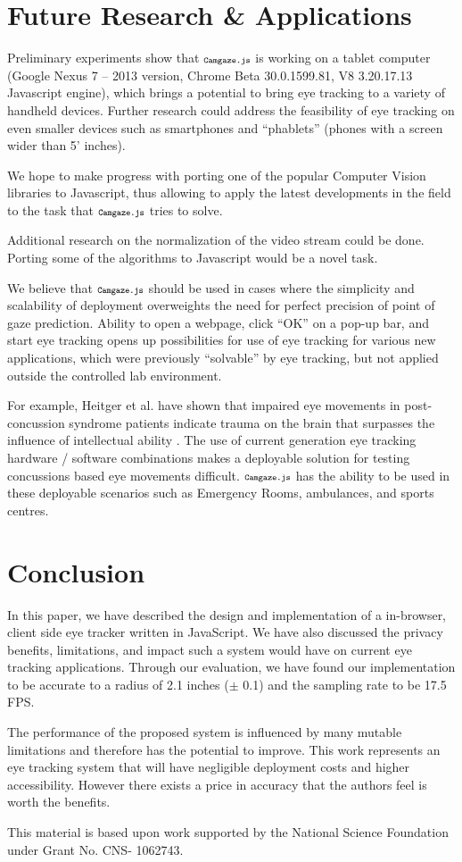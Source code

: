 \documentclass[annual]{acmsiggraph}
\newcommand{\Acronym}[1]{\ensuremath{{\small{\texttt{#1}}}}}
\newcommand{\Name}{\Acronym{Camgaze.js}} \newcommand{\False}{\Constant{false}}
\newcommand{\Constant}[1]{\ensuremath{\small{\texttt{#1}}}}
\begin{document}
\section{Future Research \& Applications}

Preliminary experiments show that $\Name$ is working on a tablet computer
(Google Nexus 7 -- 2013 version, Chrome Beta 30.0.1599.81, V8 3.20.17.13
Javascript engine), which brings a potential to bring eye tracking to a
variety of handheld devices. Further research could address the feasibility of
eye tracking on even smaller devices such as smartphones and “phablets” (phones
with a screen wider than 5’ inches).

We hope to make progress with porting one of the popular Computer Vision
libraries to Javascript, thus allowing to apply the latest developments in the
field to the task that $\Name$ tries to solve.

Additional research on the normalization of the video stream could be done.
Porting some of the algorithms to Javascript would be a novel task.

We believe that $\Name$ should be used in cases where the simplicity and
scalability of deployment overweights the need for perfect precision of point
of gaze prediction. Ability to open a webpage, click “OK” on a pop-up bar, and
start eye tracking opens up possibilities for use of eye tracking for various
new applications, which were previously “solvable” by eye tracking, but not
applied outside the controlled lab environment.

For example, Heitger et al. have shown that impaired eye movements in
post-concussion syndrome patients indicate trauma on the brain that surpasses
the influence of intellectual ability \cite{Heitger2009}. The use of current
generation eye tracking hardware / software combinations makes a deployable
solution for testing concussions based eye movements difficult. $\Name$ has the
ability to be used in these deployable scenarios such as Emergency Rooms,
ambulances, and sports centres.

\section{Conclusion}

In this paper, we have described the design and implementation of a in-browser,
client side eye tracker written in JavaScript. We have also discussed the
privacy benefits, limitations, and impact such a system would have on current
eye tracking applications. Through our evaluation, we have found our
implementation to be accurate to a radius of 2.1 inches ($\pm$ 0.1) and the
sampling rate to be 17.5 FPS.

The performance of the proposed system is influenced by many mutable
limitations and therefore has the potential to improve. This work represents an
eye tracking system that will have negligible deployment costs and higher
accessibility. However there exists a price in accuracy that the authors feel
is worth the benefits.

This material is based upon work supported by the National Science Foundation
under Grant No. CNS- 1062743.



\end{document}
